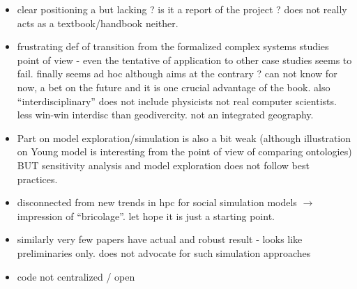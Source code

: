 \documentclass[11pt]{article}
\begin{document}
\begin{itemize}
	\item clear positioning a but lacking ? is it a report of the project ? does not really acts as a textbook/handbook neither.
	\item frustrating def of transition from the formalized complex systems studies point of view - even the tentative of application to other case studies seems to fail. finally seems ad hoc although aims at the contrary ? can not know for now, a bet on the future and it is one crucial advantage of the book. also ``interdisciplinary'' does not include physicists not real computer scientists. less win-win interdisc than geodivercity. not an integrated geography.
	\item Part on model exploration/simulation is also a bit weak (although illustration on Young model is interesting from the point of view of comparing ontologies) BUT sensitivity analysis and model exploration does not follow best practices.
	\item disconnected from new trends in hpc for social simulation models $\rightarrow$ impression of ``bricolage''. let hope it is just a starting point.
	\item similarly very few papers have actual and robust result - looks like preliminaries only. does not advocate for such simulation approaches
	\item code not centralized / open
\end{itemize}


















	
	
	
	
	
	
	
	
	
	
	
	
\end{document}
